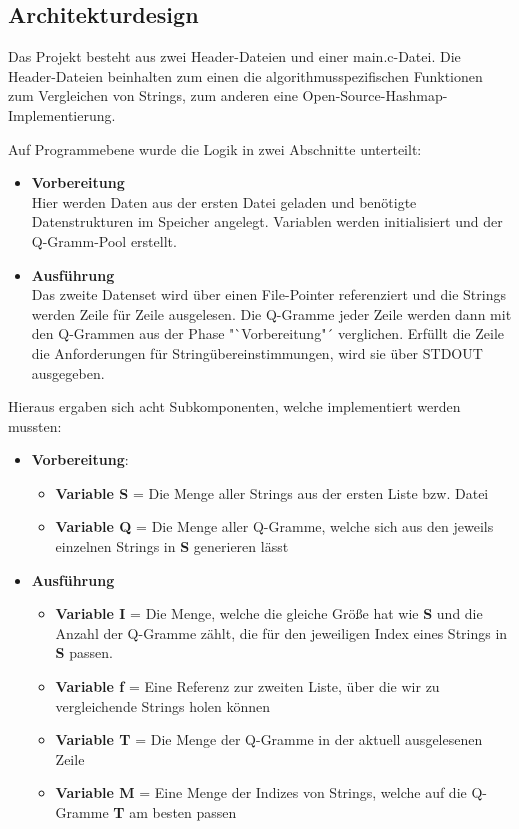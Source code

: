 \clearpage
\subsection{Architekturdesign}

Das Projekt besteht aus zwei Header-Dateien und einer main.c-Datei. Die Header-Dateien
beinhalten zum einen die algorithmusspezifischen Funktionen zum Vergleichen von
Strings, zum anderen eine Open-Source-Hashmap-Implementierung.

Auf Programmebene wurde die Logik in zwei Abschnitte unterteilt:
\begin{itemize}
    \item \textbf{Vorbereitung} \\
    Hier werden Daten aus der ersten Datei geladen und benötigte Datenstrukturen im Speicher angelegt.
    Variablen werden initialisiert und der Q-Gramm-Pool erstellt.
    \item \textbf{Ausführung} \\
    Das zweite Datenset wird über einen File-Pointer referenziert und die
    Strings werden Zeile für Zeile ausgelesen. Die Q-Gramme jeder Zeile werden dann mit den Q-Grammen aus der Phase "`Vorbereitung"´ verglichen. Erfüllt die Zeile die Anforderungen für Stringübereinstimmungen, wird sie über STDOUT ausgegeben.
\end{itemize}

Hieraus ergaben sich acht Subkomponenten, welche implementiert werden mussten:


\begin{itemize}
    \item \textbf{Vorbereitung}:
    \begin{itemize}
        \item \textbf{Variable S} = Die Menge aller Strings aus der ersten Liste bzw. Datei
        \item \textbf{Variable Q} = Die Menge aller Q-Gramme, welche sich aus den jeweils einzelnen Strings in \textbf{S} generieren lässt
    \end{itemize}

    \item \textbf{Ausführung}
    \begin{itemize}
        \item \textbf{Variable I} = Die Menge, welche die gleiche Größe hat wie \textbf{S} und die
        Anzahl der Q-Gramme zählt, die für den jeweiligen Index eines Strings in
       \textbf{S} passen.
        \item \textbf{Variable f} = Eine Referenz zur zweiten Liste, über die wir zu vergleichende Strings holen können
        \item \textbf{Variable T} = Die Menge der Q-Gramme in der aktuell ausgelesenen Zeile
        \item \textbf{Variable M} = Eine Menge der Indizes von Strings, welche auf die Q-Gramme \textbf{T} am besten passen
    \end{itemize}
\end{itemize}

